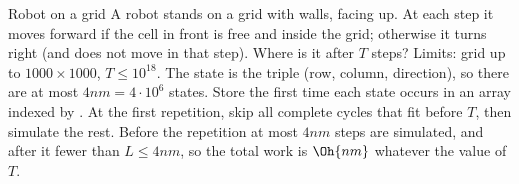 \begin{problem}{Robot on a grid}
A robot stands on a grid with walls, facing up. At each step it moves forward if the cell in front is free and inside the
grid; otherwise it turns right (and does not move in that step). Where is it after $T$ steps? Limits: grid up to
$1000 \times 1000$, $T \le 10^{18}$.
\solution The state is the triple (row, column, direction), so there are at most $4nm = 4\cdot10^6$ states. Store the first
time each state occurs in an array indexed by . At the first repetition, skip all complete cycles
that fit before $T$, then simulate the rest. Before the repetition at most $4nm$ steps are simulated, and after it fewer than
$L \le 4nm$, so the total work is $\Oh{nm}$ whatever the value of $T$.
\end{problem}

